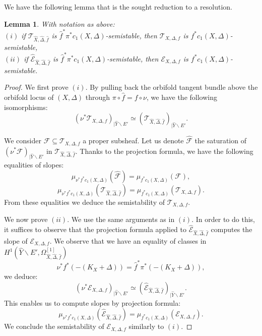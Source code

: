 \documentclass[12pt,a4paper]{amsart}
\theoremstyle{plain}
\newtheorem{lemm}[theo]{Lemma}
\theoremstyle{definition}
\begin{document}
We have the following lemma that is the sought reduction to a resolution.


\begin{lemm}\label{Reduction of semistability to the resolution}
    With notation as above:\\
    $(i)$ if $\mathcal{T}_{\widehat{X}, \widehat{\Delta}, \widehat{f}}$ is $\widehat{f}^*\pi^*c_1(X, \Delta)$-semistable, then $\mathcal{T}_{X, \Delta, f}$ is $f^*c_1(X, \Delta)$-semistable,\\
    $(ii)$ if $\widehat{\mathcal{E}}_{\widehat{X}, \widehat{\Delta}, \widehat{f}}$ is $\widehat{f}^*\pi^*c_1(X, \Delta)$-semistable, then $\mathcal{E}_{X, \Delta, f}$ is $f^*c_1(X, \Delta)$-semistable.
\end{lemm}

\begin{proof}

We first prove $(i)$. By pulling back the orbifold tangent bundle above the orbifold locus of $(X, \Delta)$ through $\pi \circ \widehat{f} = f \circ \nu $, we have the following isomorphisms:
$$
(\nu^{*}\mathcal{T}_{X, \Delta, f})_{|\widehat{Y} \backslash E'} \simeq (\mathcal{T}_{\widehat{X}, \widehat{\Delta}, \widehat{f}})_{|\widehat{Y} \backslash E'}.
$$

We consider $\mathcal{F} \subseteq \mathcal{T}_{X, \Delta, f}$ a proper subsheaf. Let us denote $\widehat{\mathcal{F}}$ the saturation of $(\nu^*\mathcal{F})_{|\widehat{Y} \backslash E'}$ in $\mathcal{T}_{\widehat{X}, \widehat{\Delta}, \widehat{f}}$. Thanks to the projection formula, we have the following equalities of slopes:
$$
\mu_{\nu^*f^*c_1(X, \Delta)}(\widehat{\mathcal{F}}) = \mu_{f^*c_1(X, \Delta)}(\mathcal{F}),
$$
$$
\mu_{\nu^*f^*c_1(X, \Delta)}(\mathcal{T}_{\widehat{X}, \widehat{\Delta}, \widehat{f}}) = \mu_{f^*c_1(X, \Delta)}(\mathcal{T}_{X, \Delta, f}).
$$
From these equalities we deduce the semistability of $\mathcal{T}_{X, \Delta, f}$.

We now prove $(ii)$. We use the same arguments as in $(i)$. In order to do this, it suffices to observe that the projection formula applied to $\widehat{\mathcal{E}}_{\widehat{X}, \widehat{\Delta}, \widehat{f}}$ computes the slope of $\mathcal{E}_{X, \Delta, f}$. We observe that we have an equality of classes in $H^1(\widehat{Y} \backslash E', \Omega^{[1]}_{\widehat{X}, \widehat{\Delta}, \widehat{f}})$
$$
\nu^*f^*(-(K_X + \Delta)) = \widehat{f}^*\pi^*(-(K_X + \Delta)),
$$
we deduce:
$$
\left(\nu^{*}\mathcal{E}_{X, \Delta, f}\right)_{|\widehat{Y} \backslash E'} \simeq (\widehat{\mathcal{E}}_{\widehat{X}, \widehat{\Delta}, \widehat{f}})_{|\widehat{Y} \backslash E'}.
$$
This enables us to compute slopes by projection formula:
$$
\mu_{\nu^*f^*c_1(X, \Delta)}(\widehat{\mathcal{E}}_{\widehat{X}, \widehat{\Delta}, \widehat{f}}) = \mu_{f^*c_1(X, \Delta)}(\mathcal{E}_{X, \Delta, f}).
$$
We conclude the semistability of $\mathcal{E}_{X, \Delta, f}$ similarly to $(i)$.
\end{proof}
\end{document}
